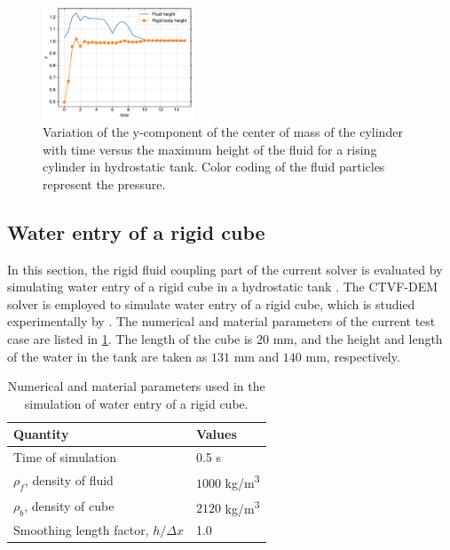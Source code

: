 \begin{figure}[!htpb]
  \centering
  \includegraphics[width=0.4\textwidth]{figures/rfc/figures/dinesh_2022_body_in_hs_tank_2d/ycom}
  \caption{Variation of the y-component of the center of mass of the cylinder
    with time versus the maximum height of the fluid for a rising cylinder in
    hydrostatic tank. Color coding of the fluid particles represent the pressure.}
\label{fig:raising-falling-solid-in-water}
\end{figure}


\FloatBarrier%
\subsection{Water entry of a rigid cube}
\label{sec:falling-solid-in-water}
In this section, the rigid fluid coupling part of the current solver is
evaluated by simulating water entry of a rigid cube in a hydrostatic tank
\citep{qiu_3d_2017}. The CTVF-DEM solver is employed to simulate water entry of
a rigid cube, which is studied experimentally by \cite{wu_two-way_2014}. The
numerical and material parameters of the current test case are listed in
\cref{tab:rfc:qiu-falling-cube}. The length of the cube is $20$ mm, and the
height and length of the water in the tank are taken as $131$ mm and $140$ mm,
respectively.
\begin{table}[!ht]
  \centering
  \begin{tabular}[!ht]{ll}
    \toprule
    Quantity & Values\\
    \midrule
    Time of simulation & 0.5 s \\
    $\rho_f$, density of fluid & $1000$ kg/m\textsuperscript{3} \\
    $\rho_b$, density of cube & $2120$ kg/m\textsuperscript{3} \\
    Smoothing length factor, $h/\Delta x$ & 1.0\\
    \bottomrule
  \end{tabular}
  \caption{Numerical and material parameters used in the simulation of water
    entry of a rigid cube.}%
  \label{tab:rfc:qiu-falling-cube}
\end{table}

